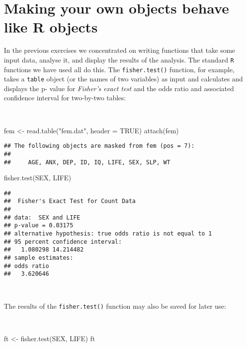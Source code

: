 \documentclass[
  12pt,
  a4paper]{book}
\newenvironment{Shaded}{\begin{snugshade}}{\end{snugshade}}
\newcommand{\AttributeTok}[1]{\textcolor[rgb]{0.77,0.63,0.00}{#1}}
\newcommand{\ConstantTok}[1]{\textcolor[rgb]{0.00,0.00,0.00}{#1}}
\newcommand{\FunctionTok}[1]{\textcolor[rgb]{0.00,0.00,0.00}{#1}}
\newcommand{\NormalTok}[1]{#1}
\newcommand{\OtherTok}[1]{\textcolor[rgb]{0.56,0.35,0.01}{#1}}
\newcommand{\StringTok}[1]{\textcolor[rgb]{0.31,0.60,0.02}{#1}}
\begin{document}
\hypertarget{exercise6}{%
\chapter{Making your own objects behave like R objects}\label{exercise6}}

In the previous exercises we concentrated on writing functions that take some input data, analyse it, and display the results of the analysis. The standard \texttt{R} functions we have used all do this. The \texttt{fisher.test()} function, for example, takes a \texttt{table} object (or the names of two variables) as input and calculates and displays the p- value for \emph{Fisher's exact test} and the odds ratio and associated confidence interval for two-by-two tables:

~

\begin{Shaded}
\begin{Highlighting}[]
\NormalTok{fem }\OtherTok{\textless{}{-}} \FunctionTok{read.table}\NormalTok{(}\StringTok{"fem.dat"}\NormalTok{, }\AttributeTok{header =} \ConstantTok{TRUE}\NormalTok{)}
\FunctionTok{attach}\NormalTok{(fem)}
\end{Highlighting}
\end{Shaded}

\begin{verbatim}
## The following objects are masked from fem (pos = 7):
## 
##     AGE, ANX, DEP, ID, IQ, LIFE, SEX, SLP, WT
\end{verbatim}

\begin{Shaded}
\begin{Highlighting}[]
\FunctionTok{fisher.test}\NormalTok{(SEX, LIFE)}
\end{Highlighting}
\end{Shaded}

\begin{verbatim}
## 
##  Fisher's Exact Test for Count Data
## 
## data:  SEX and LIFE
## p-value = 0.03175
## alternative hypothesis: true odds ratio is not equal to 1
## 95 percent confidence interval:
##   1.080298 14.214482
## sample estimates:
## odds ratio 
##   3.620646
\end{verbatim}

~

The results of the \texttt{fisher.test()} function may also be saved for later use:

~

\begin{Shaded}
\begin{Highlighting}[]
\NormalTok{ft }\OtherTok{\textless{}{-}} \FunctionTok{fisher.test}\NormalTok{(SEX, LIFE)}
\NormalTok{ft}
\end{Highlighting}
\end{Shaded}
\end{document}
